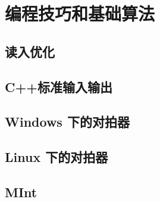 \chapter{编程技巧和基础算法}

\section{读入优化}


\section{C++标准输入输出}
















\section{Windows 下的对拍器}


\section{Linux 下的对拍器}


\section{MInt}
